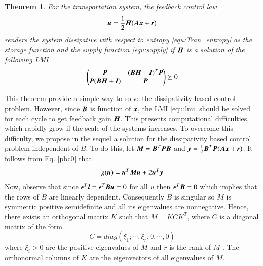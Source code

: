 \documentclass[preprint,authoryear,12pt]{elsarticle}
\renewcommand{\vec}[1]{\mbox{\boldmath$#1$}}
\newcommand{\mat}[1]{\mbox{\boldmath$#1$}}
\newtheorem{thm}{Theorem}
\begin{document}
\begin{thm}\label{thm:pbc}
For the transportation system, the feedback control law
\begin{equation}
\label{equ:feedback}
\vec{u}=\frac{1}{2}\mat{H}(\mat{A}\vec{x}+\vec{r})
\end{equation}
renders the system dissipative with respect to
entropy \eqref{equ:Tran_entropy} as the storage function and the
supply function \eqref{equ:supply} if $\mat{H}$ is a solution of the
following LMI
\begin{equation}\label{equ:lmi}
\begin{pmatrix}
\mat{P}& (\mat{B}\mat{H}+\mat{I})^T \mat{P} \\
\mat{P} (\mat{B}\mat{H}+\mat{I})  & \mat{P}
\end{pmatrix}\succeq 0
\end{equation}
\end{thm}
This theorem provide a simple way to solve the dissipativity based control problem.
However, since $\mat{B}$ is function of $\vec{x}$, the LMI \eqref{equ:lmi} should be solved for each cycle to get feedback gain $\mat{H}$. This presents  computational difficulties, which rapidly grow if the scale of the systems increases. To overcome this difficulty, we propose in the sequel a solution for the dissipativity based control problem independent of $B$. To do this, 
let
$\mat{M}=\mat{B}^T\mat{P}\mat{B}$ and
$\vec{y}=\frac{1}{2}\mat{B}^T\mat{P}(\mat{A}\vec{x}+\vec{r})$.  It
follows from Eq. \eqref{pbc0} that
\begin{equation}\label{pbcc}
g(\vec{u})=\vec{u}^T\mat{M}\vec{u}+2\vec{u}^T\vec{y}
\end{equation}
Now, observe that  since $\epsilon^T\vec{l} =\epsilon^T\mat{B}\vec{u}=0$ for all $u$ then $\epsilon^T\mat{B}=0$ which implies that the rows of $B$ are linearly dependent. Consequently  $B$ is singular so  $M$ is symmetric positive semidefinite and  all its eigenvalues  are nonnegative.  Hence, there exists an orthogonal matrix $K$ such that $M=KCK^T $, where $C$ is a diagonal matrix of the form
$$C=diag(\xi_1;\cdots,\xi_r,0,\cdots,0)$$
where $\xi_i>0$  are the positive eigenvalues  of $M$  and $r$ is the rank of $M$ . The orthonormal columns of $K$  are the eigenvectors of all eigenvalues  of $M$. 
\end{document}
